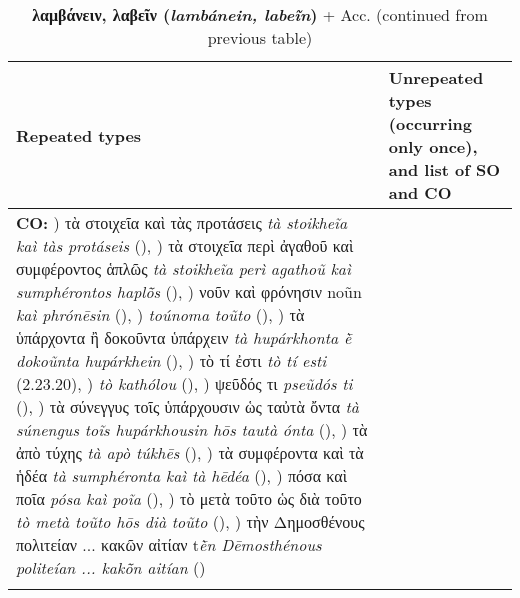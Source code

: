 \documentclass[output=paper,colorlinks,citecolor=brown]{langscibook}
\begin{document}
\begin{table}
\caption{\textbf{λαμβάνειν, λαβεῖν (\textit{lambánein, labeĩn})} + Acc. (continued from previous table)}
\footnotesize
\begin{tabularx}{\textwidth}{QQ}
        \lsptoprule
        Repeated types%
        & Unrepeated types (occurring only once), and list of SO and CO     \\
        \midrule
\textbf{CO:}
) τὰ στοιχεῖα καὶ τὰς προτάσεις \textit{tà stoikheĩa kaì tàs protáseis} (),
) τὰ στοιχεῖα περὶ ἀγαθοῦ καὶ συμφέροντος ἁπλῶς \textit{tà stoikheĩa perì agathoũ kaì sumphérontos haplō̃s} (),
) νοῦν καὶ φρόνησιν noũn \textit{kaì phrónēsin} (),
) \textit{toúnoma toũto} (),
) τὰ ὑπάρχοντα ἢ δοκοῦντα ὑπάρχειν \textit{tà hupárkhonta ḕ dokoũnta hupárkhein} (),
) τὸ τί ἐστι \textit{tò tí esti} (2.23.20),
) \textit{tò kathólou} (),
) ψεῦδός τι \textit{pseũdós ti} (),
) τὰ σύνεγγυς τοῖς ὑπάρχουσιν ὡς ταὐτὰ ὄντα \textit{tà súnengus toĩs hupárkhousin hōs tautà ónta} (),
) τὰ ἀπὸ τύχης \textit{tà apò túkhēs} (),
) τὰ συμφέροντα καὶ τὰ ἡδέα \textit{tà sumphéronta kaì tà hēdéa} (),
) πόσα καὶ ποῖα \textit{pósa kaì poĩa} (),
) τὸ μετὰ τοῦτο ὡς διὰ τοῦτο \textit{tò metà toũto hōs dià toũto} (),
) τὴν Δημοσθένους πολιτείαν ... κακῶν αἰτίαν t\textit{ḕn Dēmosthénous politeían ... kakō̃n aitían} () \\
        \lspbottomrule
\end{tabularx}
\end{table}
\end{document}
